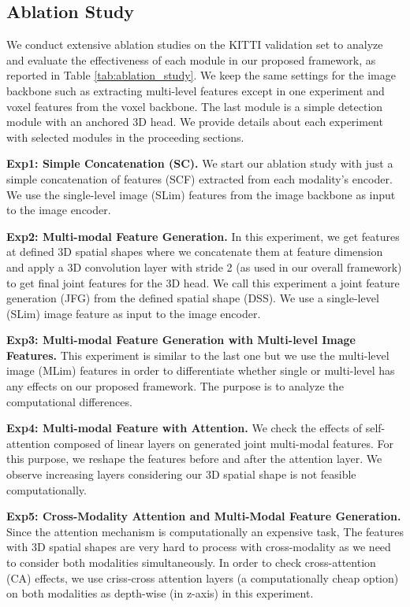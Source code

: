 \documentclass[10pt,twocolumn,letterpaper]{article}
\begin{document}
\subsection{Ablation Study}

We conduct extensive ablation studies on the KITTI validation set to analyze and evaluate the effectiveness of each module in our proposed framework, as reported in Table \ref{tab:ablation_study}. We keep the same settings for the image backbone such as extracting multi-level features except in one experiment and voxel features from the voxel backbone. The last module is a simple detection module with an anchored 3D head. We provide details about each experiment with selected modules in the proceeding sections.

\textbf{Exp1: Simple Concatenation (SC).}
%
We start our ablation study with just a simple concatenation of features (SCF) extracted from each modality's encoder. We use the single-level image (SLim) features from the image backbone as input to the image encoder.

\textbf{Exp2: Multi-modal Feature Generation.}
%
In this experiment, we get features at defined 3D spatial shapes where we concatenate them at feature dimension and apply a 3D convolution layer with stride 2 (as used in our overall framework) to get final joint features for the 3D head. We call this experiment a joint feature generation (JFG) from the defined spatial shape (DSS). We use a single-level (SLim) image feature as input to the image encoder.

\textbf{Exp3: Multi-modal Feature Generation with Multi-level Image Features.}
%
This experiment is similar to the last one but we use the multi-level image (MLim) features in order to differentiate whether single or multi-level has any effects on our proposed framework. The purpose is to analyze the computational differences. 

\textbf{Exp4: Multi-modal Feature with Attention.}
%
We check the effects of self-attention composed of linear layers on generated joint multi-modal features. For this purpose, we reshape the features before and after the attention layer. We observe increasing layers considering our 3D spatial shape is not feasible computationally. 

\textbf{Exp5: Cross-Modality Attention and Multi-Modal Feature Generation.}
%
Since the attention mechanism is computationally an expensive task, The features with 3D spatial shapes are very hard to process with cross-modality as we need to consider both modalities simultaneously. In order to check cross-attention (CA) effects, we use criss-cross attention layers \cite{huang2019ccnet} (a computationally cheap option) on both modalities as depth-wise (in z-axis) in this experiment. 
\end{document}
